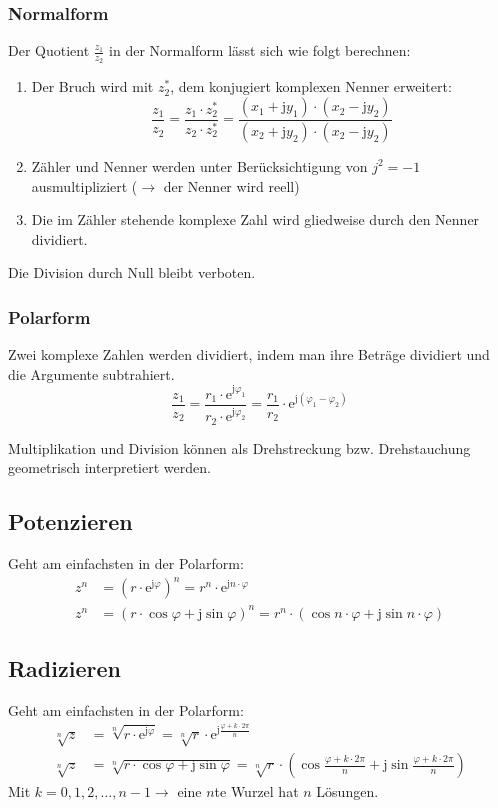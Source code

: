 \subsubsection{Normalform}
Der Quotient $\frac{z_1}{z_2}$ in der Normalform lässt sich wie folgt berechnen:
\begin{enumerate}\itemsep0em
	\item Der Bruch wird mit $z_2^*$, dem konjugiert komplexen Nenner erweitert:
	\begin{equation*}
		\frac{z_1}{z_2} = \frac{z_1 \cdot z_2^*}{z_2 \cdot z_2^*} = \frac{(x_1 + \mathrm j y_1) \cdot (x_2 - \mathrm j y_2)}{(x_2 + \mathrm j y_2) \cdot (x_2 - \mathrm j y_2)}
	\end{equation*}
	\item Zähler und Nenner werden unter Berücksichtigung von $j^2 = - 1$ ausmultipliziert ($\rightarrow$ der Nenner wird reell)
	\item Die im Zähler stehende komplexe Zahl wird gliedweise durch den Nenner dividiert.
\end{enumerate}
Die Division durch Null bleibt verboten.
\subsubsection{Polarform}
Zwei komplexe Zahlen werden dividiert, indem man ihre Beträge dividiert und die Argumente subtrahiert.
\begin{equation*}
	\frac{z_1}{z_2} = \frac{r_1 \cdot \mathrm e^{\mathrm j \varphi_1}}{r_2 \cdot \mathrm e^{\mathrm j \varphi_2}} = \frac{r_1}{r_2} \cdot \mathrm e^{\mathrm j (\varphi_1 - \varphi_2)}
\end{equation*}

Multiplikation und Division können als Drehstreckung bzw. Drehstauchung geometrisch interpretiert werden.

\subsection{Potenzieren}
Geht am einfachsten in der Polarform:
\begin{align*}
	z^n& = \left(r \cdot \mathrm e^{\mathrm j \varphi} \right)^n = r^n \cdot \mathrm e^{\mathrm j n \cdot \varphi}\\
	z^n& = \left(r \cdot \cos \varphi + \mathrm j \sin \varphi \right)^n = r^n \cdot (\cos n \cdot \varphi + \mathrm j \sin n \cdot \varphi)
\end{align*}

\subsection{Radizieren}
Geht am einfachsten in der Polarform:
\begin{align*}
	\sqrt[n]z& = \sqrt[n]{r \cdot \mathrm e^{\mathrm j \varphi}} = \sqrt[n]{r} \cdot \mathrm e^{\mathrm j \frac{\varphi + k \cdot 2 \pi}{n}}\\
	\sqrt[n]z& = \sqrt[n]{r \cdot \cos \varphi + \mathrm j \sin \varphi} = \sqrt[n]{r} \cdot (\cos \frac{\varphi + k \cdot 2 \pi}{n} + \mathrm j \sin \frac{\varphi + k\cdot 2 \pi}{n})
\end{align*}
Mit $k = 0, 1, 2, \dots, n - 1 \rightarrow$ eine $n$te Wurzel hat $n$ Lösungen.


